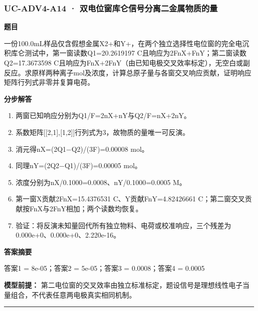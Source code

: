 \documentclass[UTF8,11pt,a4paper]{ctexart}
\begin{document}
\subsubsection*{UC-ADV4-A14 · 双电位窗库仑信号分离二金属物质的量}
\noindent\textbf{题目}\par
一份100.0mL样品仅含假想金属X2+和Y+，在两个独立选择性电位窗的完全电沉积库仑测试中，第一窗读数Q1=20.2619197 C且响应为2FnX+FnY；第二窗读数Q2=17.3673598 C且响应为FnX+2FnY（由已知电极交叉效率标定），无空白或副反应。求原样两种离子mol及浓度，计算总原子量与各窗交叉响应贡献，证明响应矩阵行列式非零并复算电荷。\par
\medskip\noindent\textbf{分步解答}
\begin{enumerate}
\item 两窗已知响应分别为Q1/F=2nX+nY与Q2/F=nX+2nY。
\item 系数矩阵[[2,1],[1,2]]行列式为3，故物质的量唯一可反演。
\item 消元得nX=(2Q1−Q2)/(3F)=0.00008 mol。
\item 同理nY=(2Q2−Q1)/(3F)=0.00005 mol。
\item 浓度分别为nX/0.1000=0.0008、nY/0.1000=0.0005 M。
\item 第一窗X贡献2FnX=15.4376531 C、Y贡献FnY=4.82426661 C；第二窗交叉贡献按FnX与2FnY相加；两个读数均恢复。
\item 验证：将反演未知量回代所有独立物料、电荷或校准响应，三个残差为0.000e+0、0.000e+0、2.220e-16。
\end{enumerate}
\noindent\textbf{答案摘要}\par
答案1 = 8e-05；答案2 = 5e-05；答案3 = 0.0008；答案4 = 0.0005\par
\noindent\textbf{模型前提：}
第二电位窗的交叉效率由独立标准标定，题设信号是理想线性电子当量组合，不代表任意两电极真实相同机制。\par
\medskip\hrule\medskip
{}
\end{document}
